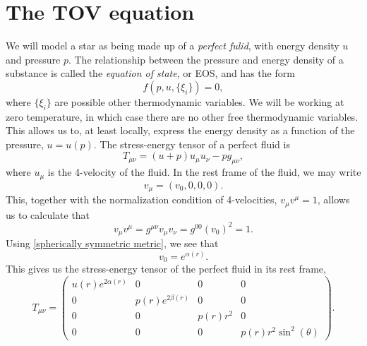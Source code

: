 \section{The TOV equation}


We will model a star as being made up of a \emph{perfect fulid}, with energy density $u$ and pressure $p$.
The relationship between the pressure and energy density of a substance is called the \emph{equation of state}, or EOS, and has the form
\begin{equation}
    \label{EOS}
    f(p, u, \{\xi_i\}) = 0,
\end{equation}
where $\{\xi_i\}$ are possible other thermodynamic variables.
We will be working at zero temperature, in which case there are no other free thermodynamic variables.
This allows us to, at least locally, express the energy density as a function of the pressure, $u = u(p)$.
The stress-energy tensor of a perfect fluid is
%
\begin{equation}
    T_{\mu \nu} = (u + p) u_\mu u_\nu - p g_{\mu \nu},
\end{equation} 
where $u_\mu$ is the 4-velocity of the fluid.
In the rest frame of the fluid, we may write 
\begin{equation}
    v_\mu = \left(v_0, 0, 0, 0\right).
\end{equation}
This, together with the normalization condition of 4-velocities, $v_\mu v^\mu = 1$, allows us to calculate that
%
\begin{equation}
    v_\mu v^\mu = g^{\mu \nu} v_\mu v_\nu = g^{00} (v_0)^2 = 1.
\end{equation}
%
Using \autoref{spherically symmetric metric}, we see that
\begin{equation}
    v_0 = e^{\alpha(r)}.
\end{equation}
%
This gives us the stress-energy tensor of the perfect fluid in its rest frame,
%
\begin{equation}
    T_{\mu \nu} 
    =
    \left(
        \begin{matrix}
            u{\left(r \right)} e^{2 \alpha{\left(r \right)}} & 0 & 0 & 0\\0 & 
            p{\left(r \right)} e^{2 \beta{\left(r \right)}} & 0 & 0\\
            0 & 0 & p{\left(r \right)} r^{2} & 0\\
            0 & 0 & 0 & p{\left(r \right)} r^{2} \sin^{2}{\left(\theta \right)}
        \end{matrix}
    \right).
\end{equation}
